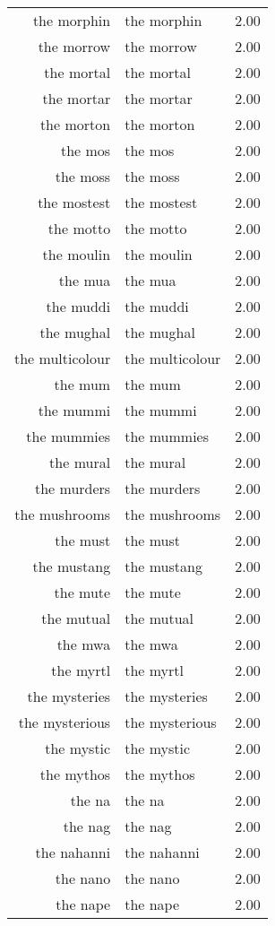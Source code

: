 \begin{table}[ht]
\begin{tabular}{rlr}
  the morphin & the morphin & 2.00 \\ 
  the morrow & the morrow & 2.00 \\ 
  the mortal & the mortal & 2.00 \\ 
  the mortar & the mortar & 2.00 \\ 
  the morton & the morton & 2.00 \\ 
  the mos & the mos & 2.00 \\ 
  the moss & the moss & 2.00 \\ 
  the mostest & the mostest & 2.00 \\ 
  the motto & the motto & 2.00 \\ 
  the moulin & the moulin & 2.00 \\ 
  the mua & the mua & 2.00 \\ 
  the muddi & the muddi & 2.00 \\ 
  the mughal & the mughal & 2.00 \\ 
  the multicolour & the multicolour & 2.00 \\ 
  the mum & the mum & 2.00 \\ 
  the mummi & the mummi & 2.00 \\ 
  the mummies & the mummies & 2.00 \\ 
  the mural & the mural & 2.00 \\ 
  the murders & the murders & 2.00 \\ 
  the mushrooms & the mushrooms & 2.00 \\ 
  the must & the must & 2.00 \\ 
  the mustang & the mustang & 2.00 \\ 
  the mute & the mute & 2.00 \\ 
  the mutual & the mutual & 2.00 \\ 
  the mwa & the mwa & 2.00 \\ 
  the myrtl & the myrtl & 2.00 \\ 
  the mysteries & the mysteries & 2.00 \\ 
  the mysterious & the mysterious & 2.00 \\ 
  the mystic & the mystic & 2.00 \\ 
  the mythos & the mythos & 2.00 \\ 
  the na & the na & 2.00 \\ 
  the nag & the nag & 2.00 \\ 
  the nahanni & the nahanni & 2.00 \\ 
  the nano & the nano & 2.00 \\ 
  the nape & the nape & 2.00 \\ 

\end{tabular}
\end{table}
